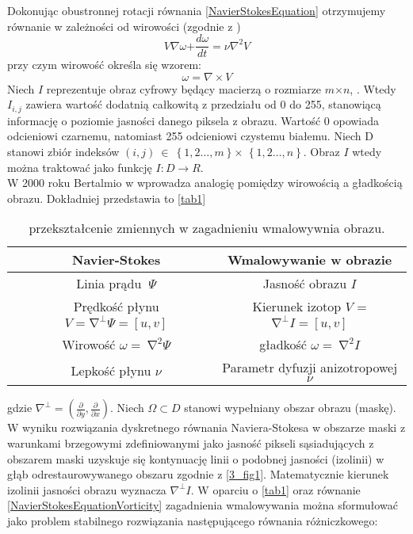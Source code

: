 \documentclass[12pt, twoside, openany]{report}
\theoremstyle{definition}
\begin{document}
Dokonując obustronnej rotacji równania \eqref{NavierStokesEquation} otrzymujemy równanie w zależności od wirowości (zgodnie z \cite{StreamfuntionVorticityForm})
\begin{equation}
V\nabla \omega \mathrm{+}\frac{d\omega }{dt}\mathrm{=}\nu {\nabla }^{\mathrm{2}}V
\label{NavierStokesEquationVorticity}
\end{equation}
przy czym wirowość określa się wzorem:
\begin{equation}
\omega =\nabla \times V
\label{Vorticity}
\end{equation}
Niech $I$ reprezentuje obraz cyfrowy będący macierzą o rozmiarze $m \mathrm{\times} n$, \cite{ebrahimi2012navier}. Wtedy $I_{i,j}$ zawiera wartość dodatnią całkowitą z przedziału od 0 do 255, stanowiącą informację o poziomie jasności danego piksela z obrazu. Wartość 0 opowiada odcieniowi czarnemu, natomiast 255 odcieniowi czystemu białemu. Niech D stanowi zbiór indeksów $(i,j)\ \in \ \left\{1,2\dots ,m\right\} \mathrm{\times}$ $\left\{1,2\dots ,n\right\}$. Obraz $I$ wtedy można traktować jako funkcję $I:D\to R$. \\
W 2000 roku Bertalmio w \cite{BertalmioNavierStokes} wprowadza analogię pomiędzy wirowością a gładkością obrazu. Dokładniej przedstawia to \autoref{tab1}
\begin{table}[!h]
	\centering
	\begin{tabular}{|cc|c|}
	\hline \hline

		& Navier-Stokes
		& Wmalowywanie w obrazie\\ \hline
		
		& Linia prądu $\ \mathit{\Psi}$ &  Jasność obrazu $I$ \\ \hline
	
		& Prędkość płynu $V = {\mathrm{\nabla }}^{\bot }\mathit{\Psi} = [u, v]$  & Kierunek izotop $V$ = ${\mathrm{\nabla }}^{\bot }I = [u, v]$ \\ \hline
		& Wirowość $\omega =\ {\mathrm{\nabla }}^2\mathit{\Psi}$ & gładkość $\omega =\ {\mathrm{\nabla }}^2I$ \\ \hline
		
		& Lepkość płynu $\nu $ & Parametr dyfuzji anizotropowej $\nu $ \\
	\hline
	\end{tabular}
	\caption{przekształcenie zmiennych w zagadnieniu wmalowywnia obrazu.}
	\label{tab1}
\end{table}
gdzie ${\nabla }^{\bot }=(\frac{\partial }{\partial y},\frac{\partial }{\partial x})$.
Niech $\mathit{\Omega}\subset D$ stanowi wypełniany obszar obrazu (maskę). W wyniku rozwiązania dyskretnego równania Naviera-Stokesa w obszarze maski z warunkami brzegowymi zdefiniowanymi jako jasność pikseli sąsiadujących z obszarem maski uzyskuje się kontynuację linii o podobnej jasności (izolinii) w głąb odrestaurowywanego obszaru zgodnie z \autoref{3_fig1}.  Matematycznie kierunek izolinii jasności obrazu wyznacza ${\nabla }^{\bot }I$. W oparciu o \autoref{tab1} oraz równanie  \eqref{NavierStokesEquationVorticity} zagadnienia wmalowywania można sformułować jako problem stabilnego rozwiązania następującego równania różniczkowego:
\end{document}
